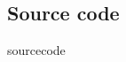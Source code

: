 \documentclass[11pt,titlepage]{report}
\begin{document}
\begin{appendices}
\renewcommand{\chapternumber}{\appendixname\space\thechapter} 

\chapter{Source code}
\label{app:sourcecode}
{sourcecode}

\end{appendices}
\end{document}
